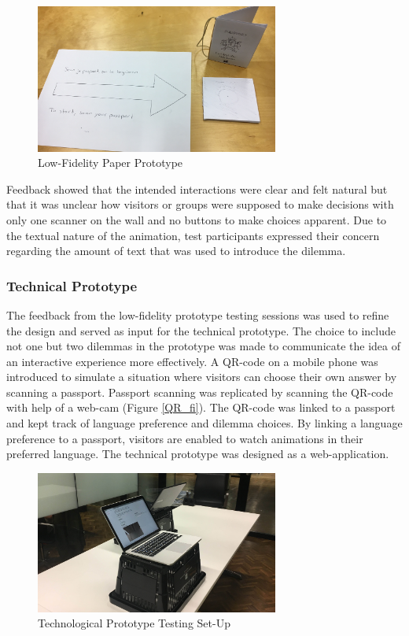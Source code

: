 \begin{figure} [h]
\includegraphics[width=8cm]{assets/paper_pro.JPG}
\caption{Low-Fidelity Paper Prototype}
\centering
\label{low_fi}
\end{figure}

Feedback showed that the intended interactions were clear and felt natural but that it was unclear how visitors or groups were supposed to make decisions with only one scanner on the wall and no buttons to make choices apparent. Due to the textual nature of the animation, test participants expressed their concern regarding the amount of text that was used to introduce the dilemma.

\subsubsection{Technical Prototype} The feedback from the low-fidelity prototype testing sessions was used to refine the design and served as input for the technical prototype. The choice to include not one but two dilemmas in the prototype was made to communicate the idea of an interactive experience more effectively. A QR-code on a mobile phone was introduced to simulate a situation where visitors can choose their own answer by scanning a passport. Passport scanning was replicated by scanning the QR-code with help of a web-cam (Figure \ref{QR_fi}). The QR-code was linked to a passport and kept track of language preference and dilemma choices. By linking a language preference to a passport, visitors are enabled to watch animations in their preferred language. The technical prototype was designed as a web-application.

\begin{figure} [h]
\includegraphics[width=8cm]{assets/first-ux-test.JPG}
\caption{Technological Prototype Testing Set-Up}
\centering
\label{tech_fi}
\end{figure}


